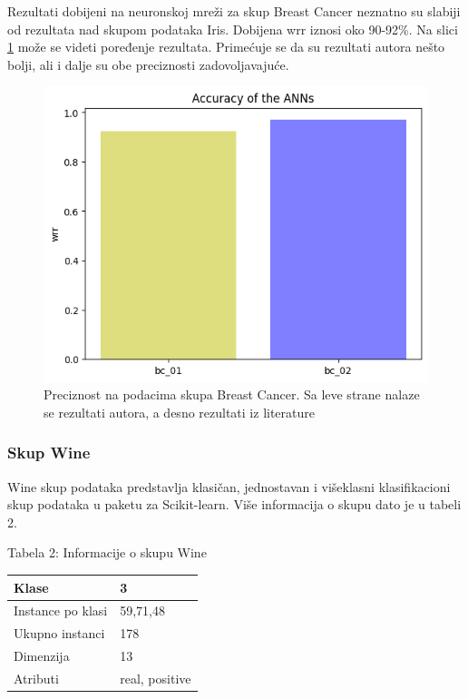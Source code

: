 \documentclass[a4paper]{article}
\begin{document}
{Rezultati dobijeni na neuronskoj mreži za skup Breast Cancer neznatno su slabiji od rezultata nad skupom podataka Iris. Dobijena wrr iznosi oko 90-92\%. Na slici \ref{fig:breastslika} može se videti poređenje rezultata. Primećuje se da su rezultati autora \cite{hindawi} nešto bolji, ali i dalje su obe preciznosti zadovoljavajuće. 

\begin{figure}[h!]
\begin{center}
\includegraphics[scale=0.4]{img/bcwrr.png}
\end{center}
\caption{Preciznost na podacima skupa Breast Cancer. Sa leve strane nalaze se rezultati autora, a desno rezultati iz literature \cite{hindawi} }
\label{fig:breastslika}
\end{figure}

\subsubsection{Skup Wine}
\label{wine}

Wine skup podataka predstavlja klasičan, jednostavan i višeklasni klasifikacioni skup podataka u paketu za Scikit-learn. Više informacija o skupu dato je u tabeli 2.

\begin{center}
Tabela 2: Informacije o skupu Wine\\
\begin{tabular}{|p{4cm}|p{2cm}|}
\hline
Klase             & 3              \\ \hline
Instance po klasi & 59,71,48       \\ \hline
Ukupno instanci   & 178            \\ \hline
Dimenzija         & 13             \\ \hline
Atributi          & real, positive \\ \hline
\end{tabular}\par
\bigskip
\end{center} 

}
\end{document}
